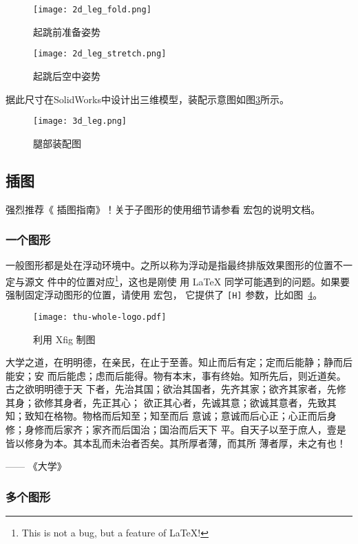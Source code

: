 \begin{figure}[H]
  \centering%
  \texttt{[image: 2d\_leg\_fold.png]}
  \caption{起跳前准备姿势}
  \label{fig:2d_leg_fold}
\end{figure}
\begin{figure}[H]
  \centering%
  \texttt{[image: 2d\_leg\_stretch.png]}
  \caption{起跳后空中姿势}
  \label{fig:2d_leg_stretch}
\end{figure}

据此尺寸在SolidWorks中设计出三维模型，装配示意图如图\ref{fig:3d_leg}所示。
\begin{figure}[H]
  \centering%
  \texttt{[image: 3d\_leg.png]}
  \caption{腿部装配图}
  \label{fig:3d_leg}
\end{figure}

\subsection{插图}
\label{sec:graphs}

强烈推荐《\LaTeXe{} 插图指南》！关于子图形的使用细节请参看  宏包的说明文档。

\subsubsection{一个图形}
\label{sec:onefig}
一般图形都是处在浮动环境中。之所以称为浮动是指最终排版效果图形的位置不一定与源文
件中的位置对应\footnote{This is not a bug, but a feature of \LaTeX!}，这也是刚使
用 \LaTeX{} 同学可能遇到的问题。如果要强制固定浮动图形的位置，请使用  宏包，
它提供了 \texttt{[H]} 参数，比如图~\ref{fig:xfig1}。
\begin{figure}[H] %
  \centering
  \texttt{[image: thu-whole-logo.pdf]}
  \caption{利用 Xfig 制图}
  \label{fig:xfig1}
\end{figure}

大学之道，在明明德，在亲民，在止于至善。知止而后有定；定而后能静；静而后能安；安
而后能虑；虑而后能得。物有本末，事有终始。知所先后，则近道矣。古之欲明明德于天
下者，先治其国；欲治其国者，先齐其家；欲齐其家者，先修其身；欲修其身者，先正其心；
欲正其心者，先诚其意；欲诚其意者，先致其知；致知在格物。物格而后知至；知至而后
意诚；意诚而后心正；心正而后身 修；身修而后家齐；家齐而后国治；国治而后天下
平。自天子以至于庶人，壹是皆以修身为本。其本乱而未治者否矣。其所厚者薄，而其所
薄者厚，未之有也！

\hfill —— 《大学》


\subsubsection{多个图形}
\label{sec:multifig}

